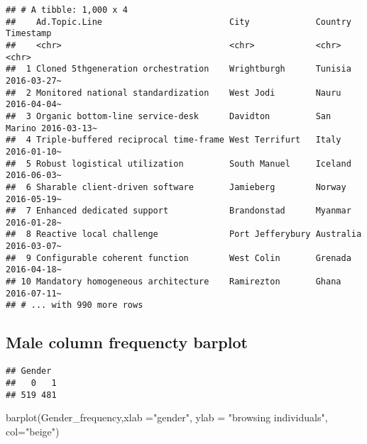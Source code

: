 \documentclass[
]{article}
\newenvironment{Shaded}{\begin{snugshade}}{\end{snugshade}}
\newcommand{\AttributeTok}[1]{\textcolor[rgb]{0.77,0.63,0.00}{#1}}
\newcommand{\FunctionTok}[1]{\textcolor[rgb]{0.00,0.00,0.00}{#1}}
\newcommand{\NormalTok}[1]{#1}
\newcommand{\OtherTok}[1]{\textcolor[rgb]{0.56,0.35,0.01}{#1}}
\newcommand{\SpecialCharTok}[1]{\textcolor[rgb]{0.00,0.00,0.00}{#1}}
\newcommand{\StringTok}[1]{\textcolor[rgb]{0.31,0.60,0.02}{#1}}
\begin{document}
\begin{verbatim}
## # A tibble: 1,000 x 4
##    Ad.Topic.Line                         City             Country    Timestamp  
##    <chr>                                 <chr>            <chr>      <chr>      
##  1 Cloned 5thgeneration orchestration    Wrightburgh      Tunisia    2016-03-27~
##  2 Monitored national standardization    West Jodi        Nauru      2016-04-04~
##  3 Organic bottom-line service-desk      Davidton         San Marino 2016-03-13~
##  4 Triple-buffered reciprocal time-frame West Terrifurt   Italy      2016-01-10~
##  5 Robust logistical utilization         South Manuel     Iceland    2016-06-03~
##  6 Sharable client-driven software       Jamieberg        Norway     2016-05-19~
##  7 Enhanced dedicated support            Brandonstad      Myanmar    2016-01-28~
##  8 Reactive local challenge              Port Jefferybury Australia  2016-03-07~
##  9 Configurable coherent function        West Colin       Grenada    2016-04-18~
## 10 Mandatory homogeneous architecture    Ramirezton       Ghana      2016-07-11~
## # ... with 990 more rows
\end{verbatim}

\hypertarget{male-column-frequencty-barplot}{%
\subsection{Male column frequencty
barplot}\label{male-column-frequencty-barplot}}

\begin{Shaded}
\end{Shaded}

\begin{verbatim}
## Gender
##   0   1 
## 519 481
\end{verbatim}

\begin{Shaded}
\begin{Highlighting}[]
\FunctionTok{barplot}\NormalTok{(Gender\_frequency,}\AttributeTok{xlab =}\StringTok{"gender"}\NormalTok{, }\AttributeTok{ylab =} \StringTok{"browsing individuals"}\NormalTok{, }\AttributeTok{col=}\StringTok{"beige"}\NormalTok{)}
\end{Highlighting}
\end{Shaded}
\end{document}
